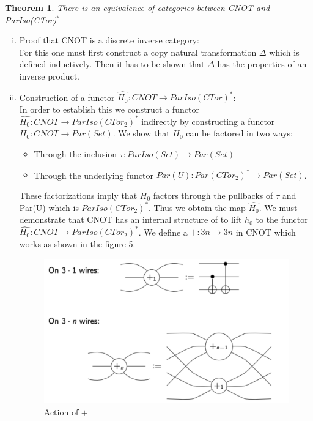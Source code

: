 \documentclass[11pt, oneside]{amsart}
\newtheorem{theorem}{Theorem}
\theoremstyle{definition}
\theoremstyle{definition}
\begin{document}
\begin{theorem}
There is an equivalence of categories between CNOT and ParIso(CTor)$^{*}$
\end{theorem}
 \begin{enumerate}[(i)]
     \item Proof that CNOT is a discrete inverse category:\\
     For this one must  first construct a copy natural transformation $\Delta$ which is defined inductively. Then it has to be shown that $\Delta$ has the properties of an inverse product.
     \item Construction of a functor $\hat{H_{0}}: CNOT \to ParIso(CTor)^{*}$:\\
     In order to establish this we construct a functor $\hat{H_{0}}: CNOT \to ParIso(CTor_{2})^{*}$ indirectly by constructing a functor $H_{0}:CNOT \to Par(Set)$. We show that $H_{0}$ can be factored in two ways:
     \begin{itemize}
         \item Through the inclusion $\tau: ParIso(Set) \to Par(Set)$
         \item Through the underlying functor $Par(U): Par(CTor_{2})^{*} \to Par(Set)$.
     \end{itemize}
     These factorizations imply that $H_{0}$ factors through the pullbacks of $\tau$ and Par(U) which is $ParIso(CTor_{2})^{*}$. Thus we obtain the map $\hat{H_{0}}$. We must demonstrate that CNOT has an internal structure of to lift $h_{0}$ to the functor $\hat{H_{0}}: CNOT \to ParIso(CTor_{2})^{*}$. We define a $+: 3n \to 3n$ in CNOT which works as shown in the figure 5.
     \begin{figure}
         \centering
         \includegraphics[scale=0.7]{torsor.pdf}
         \caption{Action of $+$}

\end{figure}
\end{enumerate}
\end{document}
